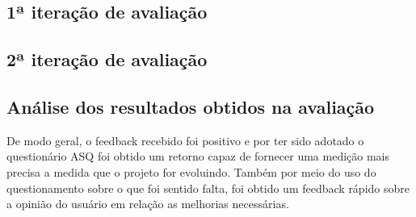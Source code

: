     \subsection{1ª iteração de avaliação}
        
        
    
    \pagebreak
    \subsection{2ª iteração de avaliação}
    
  \pagebreak
  \subsection{Análise dos resultados obtidos na avaliação}
     
    De modo geral, o feedback recebido foi positivo e por ter sido adotado o questionário ASQ foi obtido um retorno
    capaz de fornecer uma medição mais precisa a medida que o projeto for evoluindo. Também por meio do uso do 
    questionamento sobre o que foi sentido falta, foi obtido um feedback rápido sobre a opinião do usuário em
    relação as melhorias necessárias.
